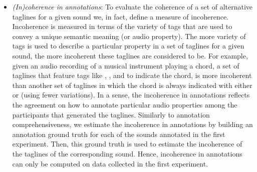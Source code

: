 \begin{itemize}
\item \textit{(In)coherence in annotations}: To evaluate the coherence of a set of alternative taglines for a given sound we, in fact, define a measure of incoherence.
Incoherence is measured in terms of the variety of tags that are used to convey a unique semantic meaning (or audio property).
The more variety of tags is used to describe a particular property in a set of taglines for a given sound, the more incoherent these taglines are considered to be. 
For example, given an audio recording of a musical instrument playing a chord, a set of taglines that feature tags like , ,  and  to indicate the chord, is more incoherent than another set of taglines in which the chord is always indicated with either  or  (using fewer variations). In a sense, the incoherence in annotations reflects the agreement on how to annotate particular audio properties among the participants that generated the taglines.
Similarly to annotation comprehensiveness, we estimate the incoherence in annotations by building an annotation ground truth for each of the sounds annotated in the first experiment. Then, this ground truth is used to estimate the incoherence of the taglines of the corresponding sound.
Hence, incoherence in annotations can only be computed on data collected in the first experiment.


\end{itemize}
